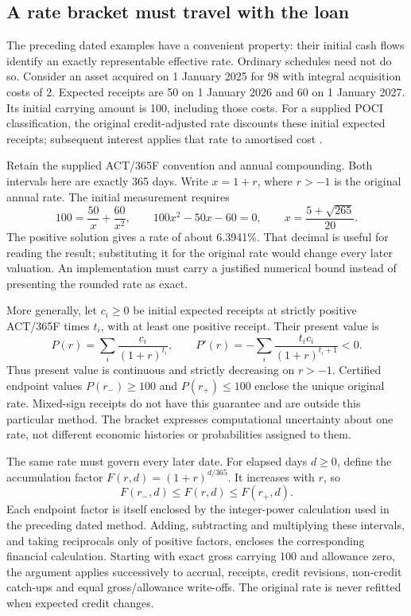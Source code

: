 \subsection{A rate bracket must travel with the loan}
\label{sec:credit-rate-interval}

The preceding dated examples have a convenient property: their initial cash
flows identify an exactly representable effective rate. Ordinary schedules
need not do so. Consider an asset acquired on 1 January 2025 for 98 with
integral acquisition costs of 2. Expected receipts are 50 on 1 January 2026
and 60 on 1 January 2027. Its initial carrying amount is 100, including those
costs. For a supplied POCI classification, the original credit-adjusted rate
discounts these initial expected receipts; subsequent interest applies that
rate to amortised cost \citep[IFRS~9.5.4.1(a),B5.4.1--2,B5.4.7--8]{eu20231803}.

Retain the supplied ACT/365F convention and annual compounding. Both intervals
here are exactly 365 days. Write \(x=1+r\), where \(r>-1\) is the original
annual rate. The initial measurement requires
\[
 100=\frac{50}{x}+\frac{60}{x^2},\qquad
 100x^2-50x-60=0,\qquad
 x=\frac{5+\sqrt{265}}{20}.
\]
The positive solution gives a rate of about 6.3941\%. That decimal is useful
for reading the result; substituting it for the original rate would change
every later valuation. An implementation must carry a justified numerical
bound instead of presenting the rounded rate as exact.

More generally, let \(c_i\geq0\) be initial expected receipts at strictly
positive ACT/365F times \(t_i\), with at least one positive receipt. Their
present value is
\[
 P(r)=\sum_i\frac{c_i}{(1+r)^{t_i}},\qquad
 P'(r)=-\sum_i\frac{t_i c_i}{(1+r)^{t_i+1}}<0.
\]
Thus present value is continuous and strictly decreasing on \(r>-1\).
Certified endpoint values \(P(r_-)\geq100\) and \(P(r_+)\leq100\)
enclose the unique original rate. Mixed-sign receipts do not have this
guarantee and are outside this particular method. The bracket expresses
computational uncertainty about one rate, not different economic histories
or probabilities assigned to them.

The same rate must govern every later date. For elapsed days \(d\geq0\),
define the accumulation factor \(F(r,d)=(1+r)^{d/365}\). It increases with
\(r\), so
\[
 F(r_-,d)\leq F(r,d)\leq F(r_+,d).
\]
Each endpoint factor is itself enclosed by the integer-power calculation
used in the preceding dated method. Adding, subtracting and multiplying
these intervals, and taking reciprocals only of positive factors, encloses
the corresponding financial calculation. Starting with exact gross carrying
100 and allowance zero, the argument applies successively to accrual,
receipts, credit revisions, non-credit catch-ups and equal gross/allowance
write-offs. The original rate is never refitted when expected credit changes.

